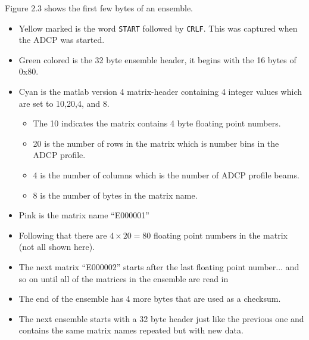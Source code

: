 Figure 2.3 shows the first few bytes of an ensemble.
\begin{itemize}
\item Yellow marked is the word \texttt{START} followed by \texttt{CRLF}. This was captured when the ADCP was started.
\item Green colored is the 32 byte ensemble header, it begins with the 16 bytes of 0x80.
\item Cyan is the matlab version 4 matrix-header containing 4 integer values which are set to 10,20,4, and 8.  
\begin{itemize}
\item The 10 indicates the matrix contains 4 byte floating point numbers. 
\item 20 is the number of rows in the matrix which is number bins in the ADCP profile. 
\item 4 is the number of columns which is the number of ADCP profile beams.  
\item 8 is the number of bytes in the matrix name.  
\end{itemize}
\item Pink is the matrix name ``E000001''
\item Following that there are $4 \times 20 = 80$  floating point numbers in the matrix (not all shown here).
\item The next matrix ``E000002'' starts after the last floating point number... and so on until all of the matrices in the ensemble are read in
\item The end of the ensemble has 4 more bytes that are used as a checksum. 
\item The next ensemble starts with a 32 byte header just like the previous one and contains the same matrix names repeated but with new data. 
\end{itemize}

